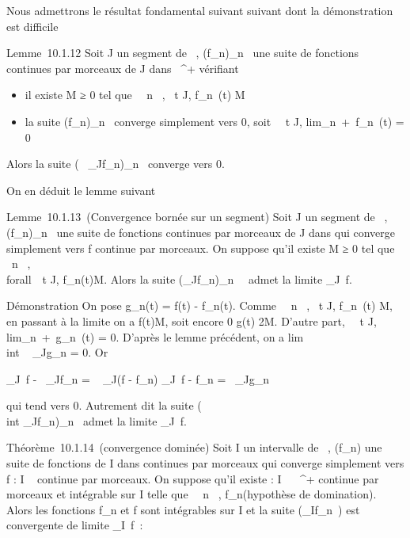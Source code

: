\documentclass[]{article}
\begin{document}
Nous admettrons le résultat fondamental suivant suivant dont la
démonstration est difficile

Lemme~10.1.12 Soit J un segment de ~, (f\_n)\_n\in{}~ une
suite de fonctions continues par morceaux de J dans ~^+
vérifiant

\begin{itemize}
\itemsep1pt\parskip0pt
\item
  il existe M ≥ 0 tel que \forall~~n \in {}~,
  \forall~t \in J, f\_n~(t) \leq M
\item
  la suite (f\_n)\_n\in{}~ converge simplement vers 0, soit
  \forall~~t \in J,
  lim\_n\rightarrow~+\infty~f\_n~(t) = 0
\end{itemize}

Alors la suite (\int ~
\_Jf\_n)\_n\in{}~ converge vers 0.

On en déduit le lemme suivant

Lemme~10.1.13~(Convergence bornée sur un segment) Soit J un segment de
~, (f\_n)\_n\in{}~ une suite de fonctions continues par
morceaux de J dans  qui converge simplement vers f continue par
morceaux. On suppose qu'il existe M ≥ 0 tel que
\forall~n \in {}~, \\forall~~t \in J,
\textbar{}f\_n(t)\textbar{}\leq M. Alors la suite
(\int  \_Jf\_n)\_n\in{}~~
admet la limite \int  \_J~f.

Démonstration On pose g\_n(t) = \textbar{}f(t) -
f\_n(t)\textbar{}. Comme \forall~~n \in {}~,
\forall~t \in J, \textbar{}f\_n~(t)\textbar{}\leq
M, en passant à la limite on a \textbar{}f(t)\textbar{}\leq M, soit encore
0 \leq g(t) \leq 2M. D'autre part, \forall~~t \in J,
lim\_n\rightarrow~+\infty~g\_n~(t) = 0. D'après
le lemme précédent, on a
lim\\int ~
\_Jg\_n = 0. Or

\left \textbar{}\int  \_J~f
-\int ~
\_Jf\_n\right \textbar{} =
\left \textbar{}\int ~
\_J(f - f\_n)\right
\textbar{}\leq\int  \_J~\textbar{}f -
f\_n\textbar{} =\int ~
\_Jg\_n

qui tend vers 0. Autrement dit la suite (\\int
 \_Jf\_n)\_n\in{}~ admet la limite
\int  \_J~f.

Théorème~10.1.14~(convergence dominée) Soit I un intervalle de ~,
(f\_n) une suite de fonctions de I dans  continues par morceaux
qui converge simplement vers f : I \rightarrow~  continue par morceaux. On suppose
qu'il existe \phi : I \rightarrow~ ~^+ continue par morceaux et intégrable
sur I telle que \forall~~n \in {}~,
\textbar{}f\_n\textbar{}\leq \phi (hypothèse de domination). Alors les
fonctions f\_n et f sont intégrables sur I et la suite
(\int  \_If\_n~) est convergente
de limite \int  \_I~f~:
\end{document}
